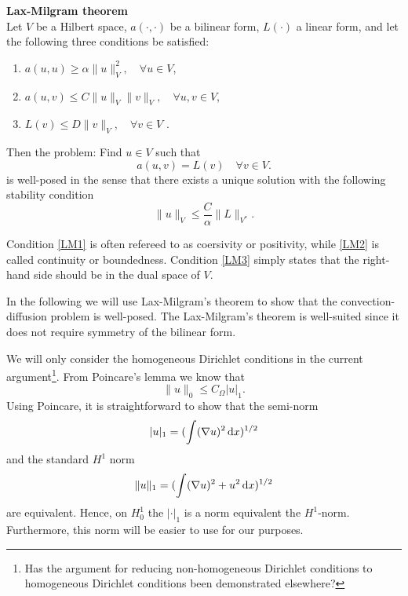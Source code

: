 \begin{theorem}{\textbf{Lax-Milgram theorem}} \\
Let $V$ be a Hilbert space, $a(\cdot, \cdot)$ be 
a bilinear form, $L(\cdot)$ a linear form, and let the following three conditions be satisfied: 
\begin{enumerate}
\item $a(u,u) \ge \alpha \|u\|^2_V, \quad \forall u \in V$,  \label{LM1} 
\item $a(u,v) \le C \|u\|_V \|v\|_V, \quad \forall u, v \in V$,  \label{LM2} 
\item $L(v) \le D \| v \|_V, \quad \forall v \in V$ .  \label{LM3} 
\end{enumerate}
Then the problem: Find $u\in V$ such that 
\[
a(u,v) = L(v) \quad \forall v \in V. 
\]
is well-posed in the sense that there exists a unique solution with the following 
stability condition
\[
\|u \|_V \le \frac{C}{\alpha} \|L\|_{V^*} .  
\]
\end{theorem}
Condition \eqref{LM1} is often refereed to as coersivity or positivity, while
\eqref{LM2} is called continuity or boundedness. Condition \ref{LM3} simply
states that the right-hand side should be in the dual space of $V$.    

In the following we will use Lax-Milgram's theorem to show that the convection-diffusion problem is well-posed. 
The Lax-Milgram's theorem is well-suited since it does not require symmetry of the bilinear form. 


We will only consider the homogeneous Dirichlet conditions in the current 
argument\footnote{Has the argument for reducing non-homogeneous Dirichlet conditions
to homogeneous Dirichlet conditions been demonstrated elsewhere?}.   
From Poincare's lemma we know  that 
\[
\|u\|_0 \le C_\Omega |u|_1.  
\]
Using Poincare, it is straightforward to show that the 
semi-norm     
\[
|u|_1 = (\int (\nabla u)^2   \, \mathrm{d}x)^{1/2}  
\]
and the standard $H^1$ norm 
\[
\|u \|_1  = (\int (\nabla u)^2 + u^2  \, \mathrm{d}x)^{1/2}  
\]
are equivalent. Hence, on $H^1_0$ the $|\cdot|_1$ is a norm
equivalent the $H^1$-norm. Furthermore, this norm will be easier to 
use for our purposes.  

